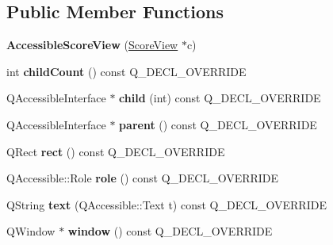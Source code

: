 \subsection*{Public Member Functions}
\begin{DoxyCompactItemize}
\item 
\mbox{\label{class_ms_1_1_accessible_score_view_a722e2edd9a259c712a3762537893839e}} 
{\bfseries Accessible\+Score\+View} (\hyperlink{class_ms_1_1_score_view}{Score\+View} $\ast$c)
\item 
\mbox{\label{class_ms_1_1_accessible_score_view_ac749fda5a91924a7403daea3345f83e5}} 
int {\bfseries child\+Count} () const Q\+\_\+\+D\+E\+C\+L\+\_\+\+O\+V\+E\+R\+R\+I\+DE
\item 
\mbox{\label{class_ms_1_1_accessible_score_view_af99df3ab0d415e06bd555b6cc94e3284}} 
Q\+Accessible\+Interface $\ast$ {\bfseries child} (int) const Q\+\_\+\+D\+E\+C\+L\+\_\+\+O\+V\+E\+R\+R\+I\+DE
\item 
\mbox{\label{class_ms_1_1_accessible_score_view_a898edbda11dffa46181d9bef3634f160}} 
Q\+Accessible\+Interface $\ast$ {\bfseries parent} () const Q\+\_\+\+D\+E\+C\+L\+\_\+\+O\+V\+E\+R\+R\+I\+DE
\item 
\mbox{\label{class_ms_1_1_accessible_score_view_ad5608f891cb20b2f71fe58d6b694e812}} 
Q\+Rect {\bfseries rect} () const Q\+\_\+\+D\+E\+C\+L\+\_\+\+O\+V\+E\+R\+R\+I\+DE
\item 
\mbox{\label{class_ms_1_1_accessible_score_view_a333e25ca804082618f31c8df645050dd}} 
Q\+Accessible\+::\+Role {\bfseries role} () const Q\+\_\+\+D\+E\+C\+L\+\_\+\+O\+V\+E\+R\+R\+I\+DE
\item 
\mbox{\label{class_ms_1_1_accessible_score_view_ad36f9576d79667772cffffdd6ddd7157}} 
Q\+String {\bfseries text} (Q\+Accessible\+::\+Text t) const Q\+\_\+\+D\+E\+C\+L\+\_\+\+O\+V\+E\+R\+R\+I\+DE
\item 
\mbox{\label{class_ms_1_1_accessible_score_view_afd53bbc4f786b5beab6a65a59d7e9907}} 
Q\+Window $\ast$ {\bfseries window} () const Q\+\_\+\+D\+E\+C\+L\+\_\+\+O\+V\+E\+R\+R\+I\+DE
\end{DoxyCompactItemize}
